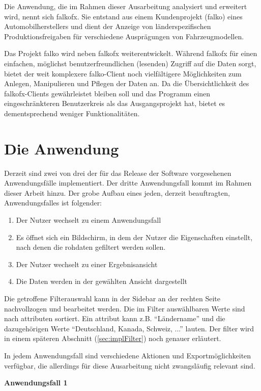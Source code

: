 Die Anwendung, die im Rahmen dieser Ausarbeitung analysiert und erweitert wird, nennt sich \gls{falkofx}. Sie entstand aus einem Kundenprojekt (\gls{falko}) eines Automobilherstellers und dient der Anzeige von länderspezifischen Produktionsfreigaben für verschiedene Ausprägungen von Fahrzeugmodellen.

Das Projekt \gls{falko} wird neben \gls{falkofx} weiterentwickelt. Während \gls{falkofx} für einen einfachen, möglichst benutzerfreundlichen (lesenden) Zugriff auf die Daten sorgt, bietet der weit komplexere \gls{falko}-Client noch vielfältigere Möglichkeiten zum Anlegen, Manipulieren und Pflegen der Daten an. Da die Übersichtlichkeit des \gls{falkofx}-Clients gewährleistet bleiben soll und das Programm einen eingeschränkteren Benutzerkreis als das Ausgangsprojekt hat, bietet es dementsprechend weniger Funktionalitäten.
\section{Die Anwendung} \label{sec:grundAnwendung}
Derzeit sind zwei von drei der für das Release der Software vorgesehenen Anwendungsfälle implementiert. Der dritte Anwendungsfall kommt im Rahmen dieser Arbeit hinzu. Der grobe Aufbau eines jeden, derzeit beauftragten, Anwendungsfalles ist folgender:
\begin{enumerate}
	\item Der Nutzer wechselt zu einem Anwendungsfall
	\item Es öffnet sich ein Bildschirm, in dem der Nutzer die Eigenschaften einstellt, nach denen die \gls{rohdaten} gefiltert werden sollen.
	\item Der Nutzer wechselt zu einer Ergebnisansicht
	\item Die Daten werden in der gewählten Ansicht dargestellt
\end{enumerate}

Die getroffene Filterauswahl kann in der Sidebar an der rechten Seite nachvollzogen und bearbeitet werden. Die im Filter auswählbaren Werte sind nach \gls{attribut}en sortiert. Ein \gls{attribut} kann z.B. \enquote{Ländername} und die dazugehörigen Werte \enquote{Deutschland, Kanada, Schweiz, ...} lauten. Der \gls{filter} wird in einem späteren Abschnitt (\ref{sec:implFilter}) noch genauer erläutert.

In jedem Anwendungsfall sind verschiedene Aktionen und Exportmöglichkeiten verfügbar, die allerdings für diese Ausarbeitung nicht zwangsläufig relevant sind.

\textbf{Anwendungsfall 1}

